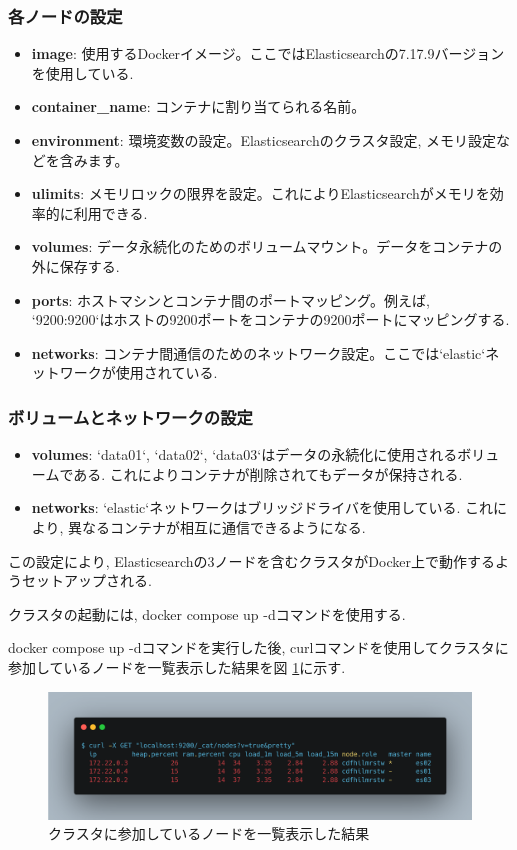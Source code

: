 \documentclass[a4j,12pt,]{jarticle}
\begin{document}
\subsubsection*{各ノードの設定}
\begin{itemize}
  \item \textbf{image}: 使用するDockerイメージ。ここではElasticsearchの7.17.9バージョンを使用している. 
  \item \textbf{container\_name}: コンテナに割り当てられる名前。
  \item \textbf{environment}: 環境変数の設定。Elasticsearchのクラスタ設定, メモリ設定などを含みます。
  \item \textbf{ulimits}: メモリロックの限界を設定。これによりElasticsearchがメモリを効率的に利用できる.
  \item \textbf{volumes}: データ永続化のためのボリュームマウント。データをコンテナの外に保存する.
  \item \textbf{ports}: ホストマシンとコンテナ間のポートマッピング。例えば, `9200:9200`はホストの9200ポートをコンテナの9200ポートにマッピングする.
  \item \textbf{networks}: コンテナ間通信のためのネットワーク設定。ここでは`elastic`ネットワークが使用されている. 
\end{itemize}

\subsubsection*{ボリュームとネットワークの設定}
\begin{itemize}
  \item \textbf{volumes}: `data01`, `data02`, `data03`はデータの永続化に使用されるボリュームである. これによりコンテナが削除されてもデータが保持される.
  \item \textbf{networks}: `elastic`ネットワークはブリッジドライバを使用している. これにより, 異なるコンテナが相互に通信できるようになる.
\end{itemize}

この設定により, Elasticsearchの3ノードを含むクラスタがDocker上で動作するようセットアップされる.

クラスタの起動には, docker compose up -dコマンドを使用する.

docker compose up -dコマンドを実行した後, curlコマンドを使用してクラスタに参加しているノードを一覧表示した結果を図 \ref{p1}に示す.

\begin{figure}[H]
  \begin{center}
    \includegraphics[width=160mm]{curl-same.png}
    \caption{クラスタに参加しているノードを一覧表示した結果}
    \label{p1}
  \end{center}
\end{figure}
\end{document}
